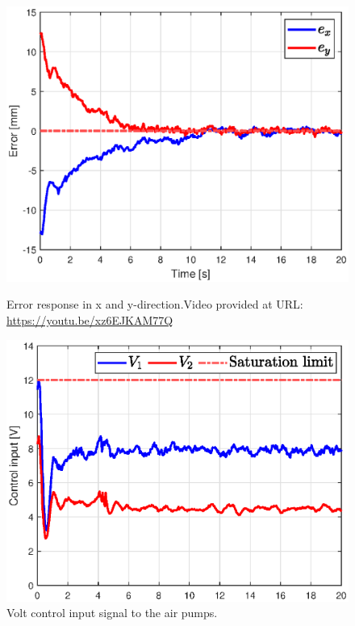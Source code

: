 \begin{figure}[H] 
    \begin{minipage}[b]{0.49\linewidth}
     \centering
    \includegraphics[width=\linewidth]{Figures/Chapter5/errrorstepleft.eps} 
    \caption{Error response in x and y-direction.Video provided at URL: \url{https://youtu.be/xz6EJKAM77Q}} 
    \label{fig5:errorswingleft} 
       \end{minipage} 
    \begin{minipage}[b]{0.49\linewidth}
     \centering
    \includegraphics[width=\linewidth]{Figures/Chapter5/controlinputstepleftV.eps} 
    \caption{Volt control input signal to the air pumps.} 
    \label{fig5:inputswingleft} 
    \end{minipage} 
\end{figure}



